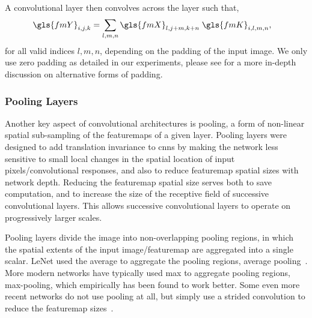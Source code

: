 \documentclass[thesis]{subfiles}
\begin{document}
A convolutional layer then convolves across the layer such that,
\begin{equation}
	\begin{aligned}
		\gls{fmY}_{i,j,k} &= \sum_{l,m,n} \gls{fmX}_{l,j+m,k+n}\; \gls{fmK}_{i,l,m,n},
	\end{aligned}
\end{equation}
for all valid indices $l,m,n$, depending on the \gls{padding} of the input image. We only use zero padding as detailed in our experiments, please see \citet[\textsection{}3.2]{szeliski2010} for a more in-depth discussion on alternative forms of padding.

\subsubsection{Pooling Layers}\label{pooling}
Another key aspect of convolutional architectures is pooling, a form of non-linear spatial sub-sampling of the \glspl{featuremap} of a given layer. Pooling layers were designed to add translation invariance to \glspl{cnn} by making the network less sensitive to small local changes in the spatial location of input pixels/convolutional responses, and also to reduce \gls{featuremap} spatial sizes with network depth. Reducing the \gls{featuremap} spatial size serves both to save computation, and to increase the size of the receptive field of successive convolutional layers. This allows successive convolutional layers to operate on progressively larger scales.

Pooling layers divide the image into non-overlapping pooling regions, in which the spatial extents of the input image/\gls{featuremap} are aggregated into a single scalar. LeNet used the average to aggregate the pooling regions, \ie average pooling~\citep{Lecun1998}. More modern networks have typically used max to aggregate pooling regions, \ie max-pooling, which empirically has been found to work better. Some even more recent networks do not use pooling at all, but simply use a strided convolution to reduce the \gls{featuremap} sizes~\citep{He2015}.
\end{document}
